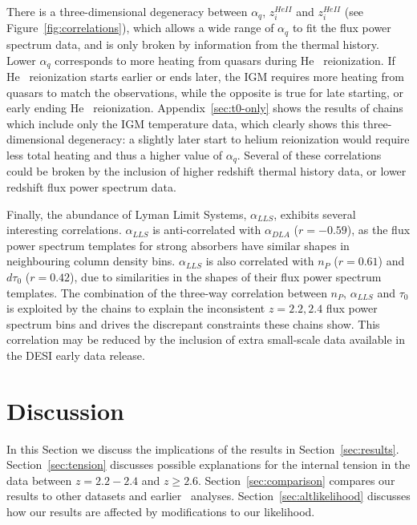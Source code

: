There is a three-dimensional degeneracy between $\alpha_q$, $z_i^{HeII}$ and $z_i^{HeII}$ (see Figure~\ref{fig:correlations}), which allows a wide range of $\alpha_q$ to fit the flux power spectrum data, and is only broken by information from the thermal history.
Lower $\alpha_q$ corresponds to more heating from quasars during He~{} reionization.
If He~{} reionization starts earlier or ends later, the IGM requires more heating from quasars to match the observations, while the opposite is true for late starting, or early ending He~{} reionization.
Appendix~\ref{sec:t0-only} shows the results of chains which include only the IGM temperature data, which clearly shows this three-dimensional degeneracy: a slightly later start to helium reionization would require less total heating and thus a higher value of $\alpha_q$. 
Several of these correlations could be broken by the inclusion of higher redshift thermal history data, or lower redshift flux power spectrum data. 

Finally, the abundance of Lyman Limit Systems, $\alpha_{LLS}$, exhibits several interesting correlations.
$\alpha_{LLS}$ is anti-correlated with $\alpha_{DLA}$ ($r= - 0.59$), as the flux power spectrum templates for strong absorbers have similar shapes in neighbouring column density bins.
$\alpha_{LLS}$ is also correlated with $n_P$ ($r=0.61$) and $d\tau_0$ ($r=0.42$), due to similarities in the shapes of their flux power spectrum templates.
The combination of the three-way correlation between $n_P$, $\alpha_{LLS}$ and $\tau_0$ is exploited by the chains to explain the inconsistent $z=2.2, 2.4$ flux power spectrum bins and drives the discrepant constraints these chains show.
This correlation may be reduced by the inclusion of extra small-scale data available in the DESI early data release.

\section{Discussion}
\label{sec:discussion}

In this Section we discuss the implications of the results in Section~\ref{sec:results}. 
Section~\ref{sec:tension} discusses possible explanations for the internal tension in the data between $z = 2.2 - 2.4$ and $z \geq 2.6$.
Section~\ref{sec:comparison} compares our results to other datasets and earlier \Lya~analyses.
Section~\ref{sec:altlikelihood} discusses how our results are affected by modifications to our likelihood.

